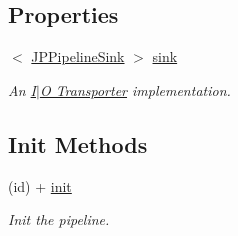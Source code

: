 \subsection*{Properties}
\begin{DoxyCompactItemize}
\item 
$<$ \hyperlink{a00034}{JPPipelineSink} $>$ \hyperlink{a00019_a7bc8e0fa419b8dc01cf9e61ae59226ba}{sink}
\begin{DoxyCompactList}\small\item\em An \hyperlink{a00002}{I$|$O Transporter} implementation. \item\end{DoxyCompactList}\end{DoxyCompactItemize}
\subsection*{Init Methods}
\begin{DoxyCompactItemize}
\item 
\hypertarget{a00019_a848d7d1c1a53feff8ab706b5e1d06248}{
(id) + \hyperlink{a00019_a848d7d1c1a53feff8ab706b5e1d06248}{init}}
\label{a00019_a848d7d1c1a53feff8ab706b5e1d06248}

\begin{DoxyCompactList}\small\item\em Init the pipeline. \item\end{DoxyCompactList}\end{DoxyCompactItemize}
